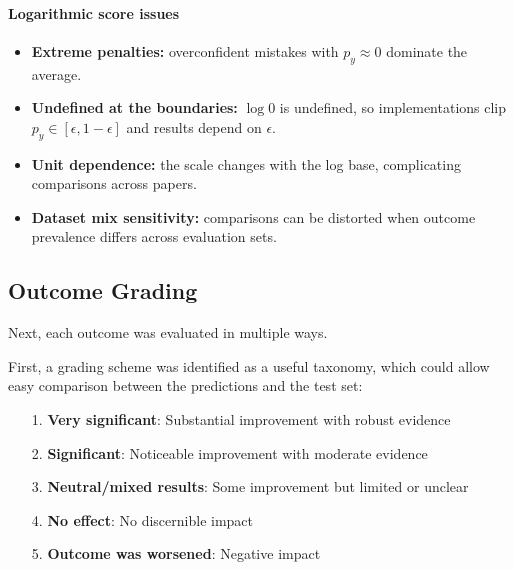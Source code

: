 \documentclass[12pt,a4paper]{article}
\begin{document}

\paragraph{Logarithmic score issues}
\begin{itemize}
\item \textbf{Extreme penalties:} overconfident mistakes with $p_y\!\approx\!0$ dominate the average.
\item \textbf{Undefined at the boundaries:} $\log 0$ is undefined, so implementations clip $p_y\in[\epsilon,1-\epsilon]$ and results depend on $\epsilon$.
\item \textbf{Unit dependence:} the scale changes with the log base, complicating comparisons across papers.
\item \textbf{Dataset mix sensitivity:} comparisons can be distorted when outcome prevalence differs across evaluation sets.
\end{itemize}


\subsection{Outcome Grading}
Next, each outcome was evaluated in multiple ways.

First, a grading scheme was identified as a useful taxonomy, which could allow easy comparison between the predictions and the test set:
\begin{itemize}
\item [1.] \textbf{Very significant}: Substantial improvement with robust evidence
\item [2.] \textbf{Significant}: Noticeable improvement with moderate evidence
\item [3.] \textbf{Neutral/mixed results}: Some improvement but limited or unclear
\item [4.] \textbf{No effect}: No discernible impact
\item [5.] \textbf{Outcome was worsened}: Negative impact
\end{itemize}
\end{document}
